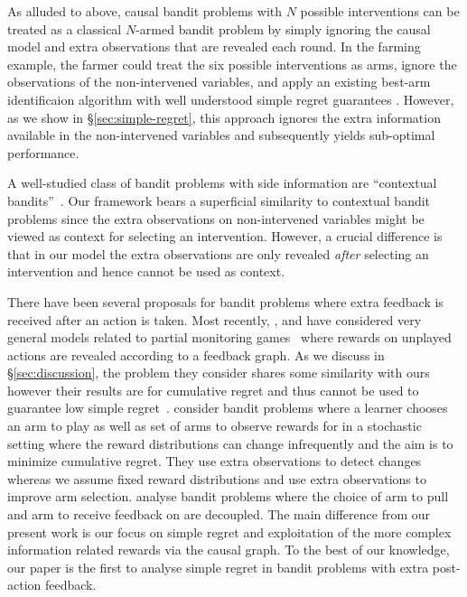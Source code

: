 As alluded to above, causal bandit problems with $N$ possible interventions can be treated as a classical $N$-armed bandit problem by simply ignoring the causal model and extra observations that are revealed each round.
In the farming example, the farmer could treat the six possible interventions as arms, ignore the observations of the non-intervened variables, and apply an existing best-arm identificaion algorithm with well understood simple regret guarantees \citep{Jamieson2013}.
However, as we show in \S\ref{sec:simple-regret}, this approach ignores the extra information available in the non-intervened variables and subsequently yields sub-optimal performance.

A well-studied class of bandit problems with side information are ``contextual bandits''~\cite{Langford2008,Agarwal2014}.
Our framework bears a superficial similarity to contextual bandit problems since the extra observations on non-intervened variables might be viewed as context for selecting an intervention. 
However, a crucial difference is that in our model the extra observations are only revealed \emph{after} selecting an intervention and hence cannot be used as context.

There have been several proposals for bandit problems where extra feedback is received after an action is taken.
Most recently, \citet{Alon2015}, \citet{Kocak2014} and \citet{wu2015online} have considered very general models related to partial monitoring games~\citep{Bartok2014} where rewards on unplayed actions are revealed according to a feedback graph.
As we discuss in \S\ref{sec:discussion}, the problem they consider shares some similarity with ours however their results are for cumulative regret and thus cannot be used to guarantee low simple regret~\citep{Bubeck2009a}.
\citet{Yu2009} consider bandit problems where a learner chooses an arm to play as well as set of arms to observe rewards for in a stochastic setting where the reward distributions can change infrequently and the aim is to minimize cumulative regret.
They use extra observations to detect changes whereas we assume fixed reward distributions and use extra observations to improve arm selection.
\citet{Avner2012} analyse bandit problems where the choice of arm to pull and arm to receive feedback on are decoupled. 
The main difference from our present work is our focus on simple regret and exploitation of the more complex information related rewards via the causal graph.
To the best of our knowledge, our paper is the first to analyse simple regret in bandit problems with extra post-action feedback.



